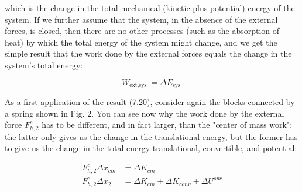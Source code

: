 \documentclass[10pt]{article}
\begin{document}
which is the change in the total mechanical (kinetic plus potential) energy of the system. If we further assume that the system, in the absence of the external forces, is closed, then there are no other processes (such as the absorption of heat) by which the total energy of the system might change, and we get the simple result that the work done by the external forces equals the change in the system's total energy:


\begin{equation*}
W_{\text {ext,sys }}=\Delta E_{\text {sys }} \tag{7.20}
\end{equation*}


As a first application of the result (7.20), consider again the blocks connected by a spring shown in Fig. 2. You can see now why the work done by the external force $F_{h, 2}^{c}$ has to be different, and in fact larger, than the "center of mass work": the latter only gives us the change in the translational energy, but the former has to give us the change in the total energy-translational, convertible, and potential:


\begin{align*}
F_{h, 2}^{c} \Delta x_{c m} & =\Delta K_{c m} \\
F_{h, 2}^{c} \Delta x_{2} & =\Delta K_{c m}+\Delta K_{c o n v}+\Delta U^{s p r} \tag{7.21}
\end{align*}
\end{document}
